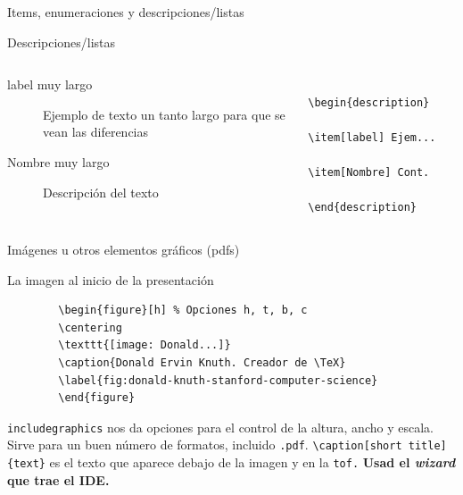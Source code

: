 \documentclass[12pt]{beamer}
\begin{document}
\begin{frame}{Items, enumeraciones y descripciones/listas}
\begin{block}{Descripciones/listas}
	\begin{columns}
		\begin{column}{0.4\textwidth}
			\begin{description}
				\item[label muy largo] Ejemplo de texto un tanto largo para que se vean las diferencias
				\item[Nombre muy largo] Descripción del texto
			\end{description}
		\end{column}
		\begin{column}{0.4\linewidth}
			\begin{verbatim}
			\begin{description}
			\item[label] Ejem...
			\item[Nombre] Cont.
			\end{description}
			\end{verbatim}
		\end{column}
	\end{columns}
\end{block}
\end{frame}

\begin{frame}[fragile]{Imágenes u otros elementos gráficos (pdfs)}
	\begin{block}{La imagen al inicio de la presentación}
		\vspace*{-1em}
		\begin{verbatim}
		\begin{figure}[h] % Opciones h, t, b, c
		\centering
		\texttt{[image: Donald...]}
		\caption{Donald Ervin Knuth. Creador de \TeX}
		\label{fig:donald-knuth-stanford-computer-science}
		\end{figure}
		\end{verbatim}\vspace*{-1em}
	\end{block}
	\texttt{includegraphics} nos da opciones para el control de la altura, ancho y escala. Sirve para un buen número de formatos, incluido \texttt{.pdf}. \verb|\caption[short title]{text}| es el texto que aparece debajo de la imagen y en la \texttt{tof.} \textbf{Usad el \textit{wizard} que trae el IDE.}
\end{frame}
\end{document}
